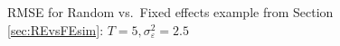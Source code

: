 \begin{figure}[H]
  \centering
  
  \caption{RMSE for Random vs.\ Fixed effects example from Section \ref{sec:REvsFEsim}: $T=5, \sigma_{\varepsilon}^2 = 2.5$}
  \label{fig:REvsFE_T5}
\end{figure}
